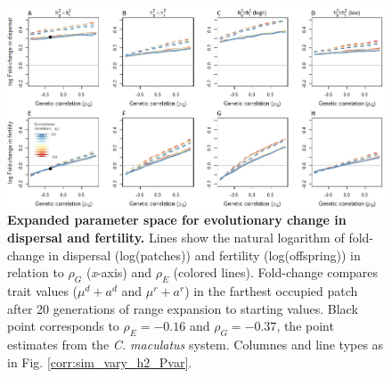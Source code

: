 \documentclass[11pt]{article}
\begin{document}
\begin{figure}[h!]
\centering
\includegraphics[width=1\linewidth]{Figures/trait_change_appendix}
\caption{\textbf{Expanded parameter space for evolutionary change in dispersal and fertility.} Lines show the natural logarithm of fold-change in dispersal (log(patches)) and fertility (log(offspring)) in relation to $\rho_{G}$ (\textit{x}-axis) and $\rho_{E}$ (colored lines). 
Fold-change compares trait values ($\mu^{d} + a^{d}$ and $\mu^{r} + a^{r}$) in the farthest occupied patch after 20 generations of range expansion to starting values. 
Black point corresponds to $\rho_{E} = -0.16$ and $\rho_{G} = -0.37$, the point estimates from the \textit{C. maculatus} system.
Columnes and line types as in Fig. \ref{corr:sim_vary_h2_Pvar}.}
\label{corr:traits_app}
\end{figure}

\newpage{}




\end{document}
